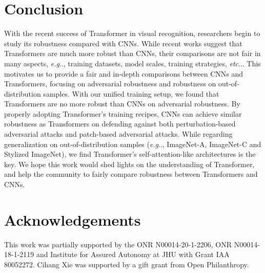 \documentclass{article}
\makeatletter
\def\vs{{\bm{s}}}
\DeclareRobustCommand\onedot{\futurelet\@let@token\@onedot}
\def\@onedot{\ifx\@let@token.\else.\null\fi\xspace}
\def\eg{\emph{e.g}\onedot} \def\Eg{\emph{E.g}\onedot}
\def\etc{\emph{etc}\onedot} \def\vs{\emph{vs}\onedot}
\makeatother
\begin{document}
\section{Conclusion}
With the recent success of Transformer in visual recognition, researchers begin to study its robustness compared with CNNs. While recent works suggest that Transformers are much more robust than CNNs, their comparisons are not fair in many aspects, \eg, training datasets, model scales, training strategies, \etc. This motivates us to provide a fair and in-depth comparisons between CNNs and Transformers, focusing on adversarial robustness and robustness on out-of-distribution samples. With our unified training setup, we found that Transformers are no more robust than CNNs on adversarial robustness. By properly adopting Transformer's training recipes, CNNs can achieve similar robustness as Transformers on defending against both perturbation-based adversarial attacks and patch-based adversarial attacks. While regarding generalization on out-of-distribution samples (\eg, ImageNet-A, ImageNet-C and Stylized ImageNet), we find Transformer's self-attention-like architectures is the key.  We hope this work would shed lights on the understanding of Transformer, and help the community to fairly compare robustness between Transformers and CNNs.



\section*{Acknowledgements}
This work was partially supported by the ONR N00014-20-1-2206, ONR N00014-18-1-2119 and Institute for Assured Autonomy at JHU with Grant IAA 80052272. Cihang Xie was supported by a gift grant from Open Philanthropy. 





{\footnotesize
	
}
\end{document}
